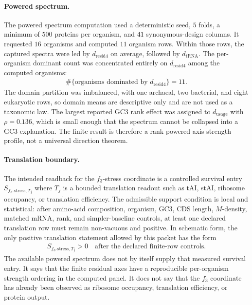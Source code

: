 \paragraph{Powered spectrum.}
The powered spectrum computation used a deterministic seed, $5$ folds, a minimum of $500$ proteins per organism, and $41$ synonymous-design columns.  It requested $16$ organisms and computed $11$ organism rows.  Within those rows, the captured spectra were led by $d_{\mathrm{resid4}}$ on average, followed by $d_{\mathrm{tRNA}}$.  The per-organism dominant count was concentrated entirely on $d_{\mathrm{resid4}}$ among the computed organisms:
$$
\begin{aligned}
\#\{\text{organisms dominated by }d_{\mathrm{resid4}}\}=11.
\end{aligned}
$$
The domain partition was imbalanced, with one archaeal, two bacterial, and eight eukaryotic rows, so domain means are descriptive only and are not used as a taxonomic law.  The largest reported GC3 rank effect was assigned to $d_{\mathrm{usage}}$ with $\rho=0.136$, which is small enough that the spectrum cannot be collapsed into a GC3 explanation.  The finite result is therefore a rank-powered axis-strength profile, not a universal direction theorem.

\paragraph{Translation boundary.}
The intended readback for the $f_3$-stress coordinate is a controlled survival entry $S_{f_3\text{-stress},T_j}$ where $T_j$ is a bounded translation readout such as tAI, stAI, ribosome occupancy, or translation efficiency.  The admissible support condition is local and statistical: after amino-acid composition, organism, GC3, CDS length, $M$-density, matched mRNA, rank, and simpler-baseline controls, at least one declared translation row must remain non-vacuous and positive.  In schematic form, the only positive translation statement allowed by this packet has the form
$$
\begin{aligned}
S_{f_3\text{-stress},T_j}>0
\quad\text{after the declared finite-row controls.}
\end{aligned}
$$
The available powered spectrum does not by itself supply that measured survival entry.  It says that the finite residual axes have a reproducible per-organism strength ordering in the computed panel.  It does not say that the $f_3$ coordinate has already been observed as ribosome occupancy, translation efficiency, or protein output.

